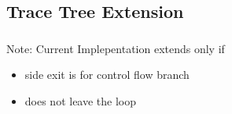 \documentclass[mathserif,10pt]{beamer}
\begin{document}
\frame
{
  \frametitle{\subsecname}
  \begin{figure}[h]
  \centering
  \end{figure}
}
\subsection{Trace Tree Extension}
\frame
{
  \frametitle{\subsecname}
  \begin{figure}[h]
  \centering
  \end{figure}
Note: Current Implepentation extends only if 
        \begin{itemize}
          \item side exit is for control flow branch
          \item does not leave the loop
        \end{itemize}
}
\end{document}
